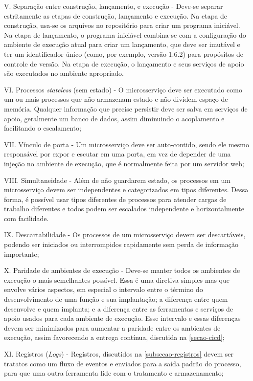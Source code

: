 V. Separação entre construção, lançamento, e execução - Deve-se separar estritamente as etapas de construção, lançamento e execução. Na etapa de construção, usa-se os arquivos no repositório para criar um programa iniciável. Na etapa de lançamento, o programa iniciável combina-se com a configuração do ambiente de execução atual para criar um lançamento, que deve ser imutável e ter um identificador único (como, por exemplo, versão 1.6.2) para propósitos de controle de versão. Na etapa de execução, o lançamento e seus serviços de apoio são executados no ambiente apropriado.

VI. Processos \emph{stateless} (sem estado) - O microsserviço deve ser executado como um ou mais processos que não armazenam estado e não dividem espaço de memória. Qualquer informação que precise persistir deve ser salva em serviços de apoio, geralmente um banco de dados, assim diminuindo o acoplamento e facilitando o escalamento;

VII. Vínculo de porta - Um microsserviço deve ser auto-contido, sendo ele mesmo responsável por expor e escutar em uma porta, em vez de depender de uma injeção no ambiente de execução, que é normalmente feita por um servidor web;

VIII. Simultaneidade - Além de não guardarem estado, os processos em um microsserviço devem ser independentes e categorizados em tipos diferentes. Dessa forma, é possível usar tipos diferentes de processos para atender cargas de trabalho diferentes e todos podem ser escalados independente e horizontalmente com facilidade.

IX. Descartabilidade - Os processos de um microsserviço devem ser descartáveis, podendo ser iniciados ou interrompidos rapidamente sem perda de informação importante;

X. Paridade de ambientes de execução - Deve-se manter todos os ambientes de execução o mais semelhantes possível. Essa é uma diretiva simples mas que envolve vários aspectos, em especial o intervalo entre o término do desenvolvimento de uma função e sua implantação; a diferença entre quem desenvolve e quem implanta; e a diferença entre as ferramentas e serviços de apoio usados para cada ambiente de execução. Esse intervalo e essas diferenças devem ser minimizados para aumentar a paridade entre os ambientes de execução, assim favorecendo a entrega contínua, discutida na \autoref{secao-cicd};

XI. Registros (\emph{Logs}) - Registros, discutidos na \autoref{subsecao-registros} devem ser tratatos como um fluxo de eventos e enviados para a saída padrão do processo, para que uma outra ferramenta lide com o tratamento e armazenamento;

